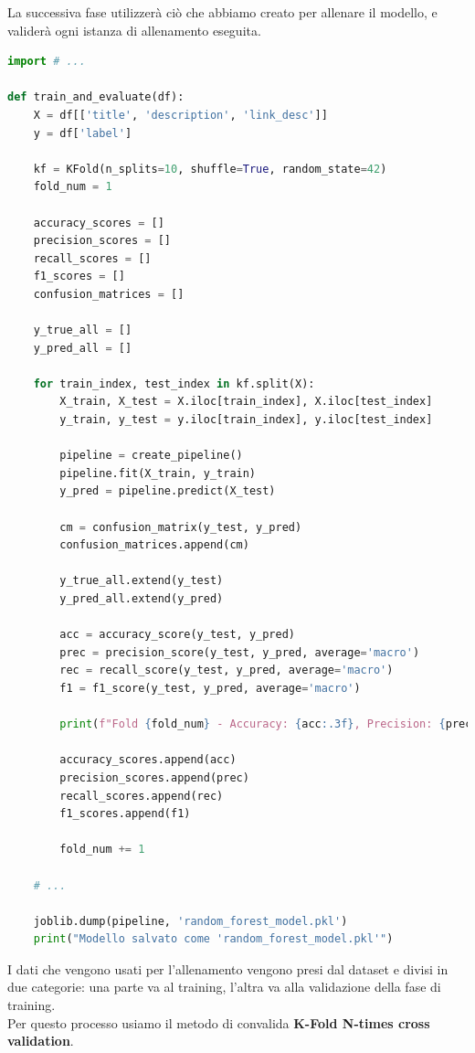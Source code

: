 \documentclass[a4paper,12pt]{report}
\begin{document}
\hfill \break
La successiva fase utilizzerà ciò che abbiamo creato per allenare il modello, e validerà ogni istanza di allenamento eseguita.
\begin{lstlisting}[language=Python]
import # ...

def train_and_evaluate(df):
    X = df[['title', 'description', 'link_desc']]
    y = df['label']

    kf = KFold(n_splits=10, shuffle=True, random_state=42)
    fold_num = 1

    accuracy_scores = []
    precision_scores = []
    recall_scores = []
    f1_scores = []
    confusion_matrices = []

    y_true_all = []
    y_pred_all = []
    
    for train_index, test_index in kf.split(X):
        X_train, X_test = X.iloc[train_index], X.iloc[test_index]
        y_train, y_test = y.iloc[train_index], y.iloc[test_index]

        pipeline = create_pipeline()
        pipeline.fit(X_train, y_train)
        y_pred = pipeline.predict(X_test)

        cm = confusion_matrix(y_test, y_pred)
        confusion_matrices.append(cm)

        y_true_all.extend(y_test)
        y_pred_all.extend(y_pred)

        acc = accuracy_score(y_test, y_pred)
        prec = precision_score(y_test, y_pred, average='macro')
        rec = recall_score(y_test, y_pred, average='macro')
        f1 = f1_score(y_test, y_pred, average='macro')

        print(f"Fold {fold_num} - Accuracy: {acc:.3f}, Precision: {prec:.3f}, Recall: {rec:.3f}, F1-Score: {f1:.3f}")

        accuracy_scores.append(acc)
        precision_scores.append(prec)
        recall_scores.append(rec)
        f1_scores.append(f1)

        fold_num += 1

    # ...

    joblib.dump(pipeline, 'random_forest_model.pkl')
    print("Modello salvato come 'random_forest_model.pkl'")
\end{lstlisting}
I dati che vengono usati per l'allenamento vengono presi dal dataset e divisi in due categorie: una parte va al training, l'altra va alla validazione della fase di training.\\
Per questo processo usiamo il metodo di convalida \textbf{K-Fold N-times cross validation}.\\
\end{document}

